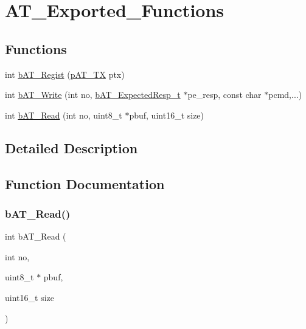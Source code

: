 \hypertarget{group___a_t___exported___functions}{}\section{A\+T\+\_\+\+Exported\+\_\+\+Functions}
\label{group___a_t___exported___functions}
\subsection*{Functions}
\begin{DoxyCompactItemize}
\item 
int \mbox{\hyperlink{group___a_t___exported___functions_gafab0d30ccf93e9d332ab8c54389b2e97}{b\+A\+T\+\_\+\+Regist}} (\mbox{\hyperlink{group___a_t___exported___types_definitions_ga160ea044085772742d8b369ae5af1f8e}{p\+A\+T\+\_\+\+TX}} ptx)
\item 
int \mbox{\hyperlink{group___a_t___exported___functions_ga70c7211e4de1db5c3f4c7e8707e4979d}{b\+A\+T\+\_\+\+Write}} (int no, \mbox{\hyperlink{structb_a_t___expected_resp__t}{b\+A\+T\+\_\+\+Expected\+Resp\+\_\+t}} $\ast$pe\+\_\+resp, const char $\ast$pcmd,...)
\item 
int \mbox{\hyperlink{group___a_t___exported___functions_ga8c06cbe99efea24cb2510ac555967fbf}{b\+A\+T\+\_\+\+Read}} (int no, uint8\+\_\+t $\ast$pbuf, uint16\+\_\+t size)
\end{DoxyCompactItemize}


\subsection{Detailed Description}


\subsection{Function Documentation}
\mbox{\label{group___a_t___exported___functions_ga8c06cbe99efea24cb2510ac555967fbf}} 
\subsubsection{\texorpdfstring{b\+A\+T\+\_\+\+Read()}{bAT\_Read()}}
{\footnotesize\ttfamily int b\+A\+T\+\_\+\+Read (\begin{DoxyParamCaption}\item[{int}]{no,  }\item[{uint8\+\_\+t $\ast$}]{pbuf,  }\item[{uint16\+\_\+t}]{size }\end{DoxyParamCaption})}

